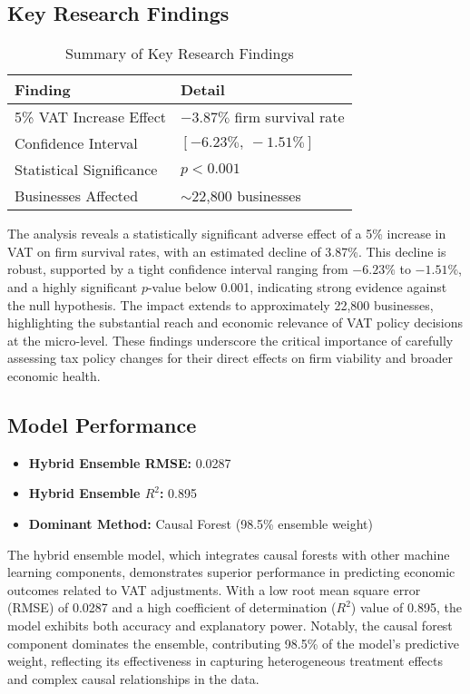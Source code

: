 \subsection{Key Research Findings}

\begin{table}[H]
\centering
\small
\caption{Summary of Key Research Findings}
\label{tab:key_findings}
\begin{tabular}{|p{4.5cm}|p{8cm}|}
\hline
\textbf{Finding} & \textbf{Detail} \\
\hline
5\% VAT Increase Effect & $-3.87\%$ firm survival rate \\
\hline
Confidence Interval & $[-6.23\%,\ -1.51\%]$ \\
\hline
Statistical Significance & $p < 0.001$ \\
\hline
Businesses Affected & $\sim$22,800 businesses \\
\hline
\end{tabular}
\end{table}

\vspace{0.5em}
\noindent
The analysis reveals a statistically significant adverse effect of a 5\% increase in VAT on firm survival rates, with an estimated decline of 3.87\%. This decline is robust, supported by a tight confidence interval ranging from $-6.23\%$ to $-1.51\%$, and a highly significant $p$-value below 0.001, indicating strong evidence against the null hypothesis. The impact extends to approximately 22,800 businesses, highlighting the substantial reach and economic relevance of VAT policy decisions at the micro-level. These findings underscore the critical importance of carefully assessing tax policy changes for their direct effects on firm viability and broader economic health.



\subsection{Model Performance}

\begin{itemize}
  \item \textbf{Hybrid Ensemble RMSE:} 0.0287
  \item \textbf{Hybrid Ensemble $R^2$:} 0.895
  \item \textbf{Dominant Method:} Causal Forest (98.5\% ensemble weight)
\end{itemize}

\vspace{0.5em}
\noindent
The hybrid ensemble model, which integrates causal forests with other machine learning components, demonstrates superior performance in predicting economic outcomes related to VAT adjustments. With a low root mean square error (RMSE) of 0.0287 and a high coefficient of determination ($R^2$) value of 0.895, the model exhibits both accuracy and explanatory power. Notably, the causal forest component dominates the ensemble, contributing 98.5\% of the model’s predictive weight, reflecting its effectiveness in capturing heterogeneous treatment effects and complex causal relationships in the data.

